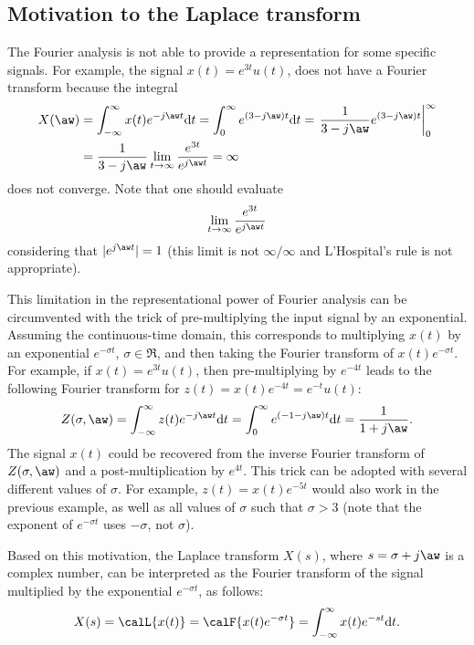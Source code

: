 \subsection{Motivation to the Laplace transform}
The Fourier analysis is not able to provide a representation for some specific signals. For example,
the signal $x(t)= e^{3t} u(t)$, does not have a Fourier transform because the integral
\begin{align*}
X(\aw) &= \int_{-\infty}^\infty x(t) e^{- j \aw t} \textrm{d}t = \int_{0}^\infty e^{(3 - j \aw) t} \textrm{d}t =
\left. \frac 1 {3-j \aw} {e^{(3-j \aw) t}} \right|_{0}^{\infty}\\
& = \frac 1 {3-j \aw} \lim_{t \rightarrow \infty} \frac{e^{3t}}{e^{j \aw t}} = \infty
\end{align*}
does not converge. Note that one should evaluate
\[
\lim_{t \rightarrow \infty} \frac{e^{3t}}{e^{j \aw t}}
\]
considering that $|e^{j \aw t}| = 1$ (this limit is not $\infty / \infty$ and L'Hospital's rule is not appropriate).

This limitation in the representational power of Fourier analysis can be circumvented with the trick of pre-multiplying the input signal by an exponential. Assuming the continuous-time domain, this corresponds to multiplying $x(t)$ by an exponential $e^{-\sigma t}$, $\sigma \in \Re$, and then taking the Fourier transform of $x(t) e^{-\sigma t}$. For example, if $x(t)= e^{3t} u(t)$, then pre-multiplying by $e^{-4t}$ leads to the following Fourier transform for $z(t) = x(t) e^{-4t} = e^{-t} u(t)$:
\[
Z(\sigma,\aw) = \int_{-\infty}^\infty z(t) e^{- j \aw t} \textrm{d}t = \int_{0}^\infty e^{(-1 - j \aw) t} \textrm{d}t = \frac {1} {1+j \aw}.
\]
The signal $x(t)$ could be recovered from the inverse Fourier transform of $Z(\sigma,\aw)$ and a post-multiplication by $e^{4t}$.
This trick can be adopted with several different values of $\sigma$. For example, $z(t) = x(t) e^{-5t}$ would also work in the previous example, as well as all values of $\sigma$ such that $\sigma > 3$ (note that the exponent of $e^{-\sigma t}$ uses $- \sigma$, not $\sigma$).

Based on this motivation, the Laplace transform $X(s)$, where $s=\sigma+j\aw$ is a complex number, can be interpreted as the Fourier transform of the signal multiplied by the exponential $e^{-\sigma t}$, as follows:
\begin{equation}
X(s) = \calL\{x(t)\} = \calF\{x(t) e^{-\sigma t}\} = \int_{-\infty}^\infty x(t) e^{-s t} \textrm{d}t.
\label{eq:laplace_forward}
\end{equation}


